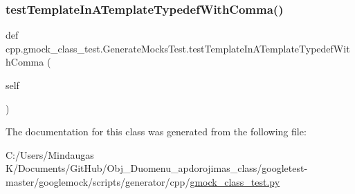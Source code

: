 \subsubsection{\texorpdfstring{testTemplateInATemplateTypedefWithComma()}{testTemplateInATemplateTypedefWithComma()}}
{\footnotesize\ttfamily def cpp.\+gmock\+\_\+class\+\_\+test.\+Generate\+Mocks\+Test.\+test\+Template\+In\+A\+Template\+Typedef\+With\+Comma (\begin{DoxyParamCaption}\item[{}]{self }\end{DoxyParamCaption})}



The documentation for this class was generated from the following file\+:\begin{DoxyCompactItemize}
\item 
C\+:/\+Users/\+Mindaugas K/\+Documents/\+Git\+Hub/\+Obj\+\_\+\+Duomenu\+\_\+apdorojimas\+\_\+class/googletest-\/master/googlemock/scripts/generator/cpp/\mbox{\hyperlink{googletest-master_2googlemock_2scripts_2generator_2cpp_2gmock__class__test_8py}{gmock\+\_\+class\+\_\+test.\+py}}\end{DoxyCompactItemize}
